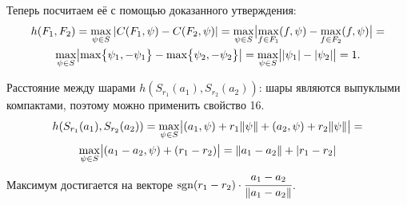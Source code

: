 \begin{exmp}
\begin{center}
    \end{center}

    Теперь посчитаем её с помощью доказанного утверждения:
    \begin{multline*}
        h(F_1, F_2) = \max\limits_{\psi \in S} |C(F_1, \psi) - C(F_2, \psi)| = 
        \max\limits_{\psi \in S} \bigl| \max\limits_{f \in F_1} (f, \psi) - \max\limits_{f \in F_2} (f, \psi) \bigr| = \\
        \max\limits_{\psi \in S} \bigl| \max \bigl\{ \psi_1, -\psi_1 \bigr\} - \max \bigl\{ \psi_2, -\psi_2 \bigr\} \bigr| = 
        \max\limits_{\psi \in S} \bigl| |\psi_1| - |\psi_2| \bigr| = 1.
    \end{multline*}
\end{exmp}

\begin{exmp}
    Расстояние между шарами $h(S_{r_1}(a_1), S_{r_2}(a_2))$:
    шары являются выпуклыми компактами, поэтому можно применить свойство 16.
    \begin{multline*}
        h(S_{r_1}(a_1), S_{r_2}(a_2)) = \max\limits_{\psi \in S} \bigl|(a_1, \psi) + r_1 \lVert \psi \rVert + (a_2, \psi) + r_2 \lVert \psi \rVert\bigr| = \\
        \max\limits_{\psi \in S} \bigl|(a_1 - a_2, \psi) + (r_1 - r_2)\bigr| = \lVert a_1 - a_2 \rVert + |r_1 - r_2|
    \end{multline*}
    Максимум достигается на векторе $\operatorname{sgn}(r_1 - r_2) \cdot \cfrac{a_1 - a_2}{\lVert a_1 - a_2 \rVert}$.
\end{exmp}

